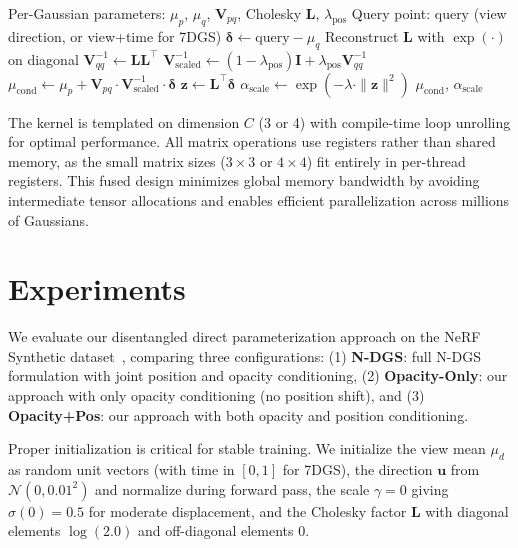 \documentclass{article}
\begin{document}
\begin{algorithm}[h]
\caption{Conditional Gaussian Slicing}
\label{alg:slice}
\begin{algorithmic}[1]
\Require Per-Gaussian parameters: $\mu_p$, $\mu_q$, $\mathbf{V}_{pq}$, Cholesky $\mathbf{L}$, $\lambda_{\text{pos}}$
\Require Query point: $\text{query}$ (view direction, or view+time for 7DGS)
\State $\boldsymbol{\delta} \gets \text{query} - \mu_q$ 
\State Reconstruct $\mathbf{L}$ with $\exp(\cdot)$ on diagonal 
\State $\mathbf{V}_{qq}^{-1} \gets \mathbf{L}\mathbf{L}^\top$ 
\State $\mathbf{V}_{\text{scaled}}^{-1} \gets (1-\lambda_{\text{pos}}) \mathbf{I} + \lambda_{\text{pos}} \mathbf{V}_{qq}^{-1}$ 
\State $\mu_{\text{cond}} \gets \mu_p + \mathbf{V}_{pq} \cdot \mathbf{V}_{\text{scaled}}^{-1} \cdot \boldsymbol{\delta}$ 
\State $\mathbf{z} \gets \mathbf{L}^\top \boldsymbol{\delta}$ 
\State $\alpha_{\text{scale}} \gets \exp(-\lambda \cdot \|\mathbf{z}\|^2)$ 
\State \Return $\mu_{\text{cond}}$, $\alpha_{\text{scale}}$
\end{algorithmic}
\end{algorithm}

The kernel is templated on dimension $C$ (3 or 4) with compile-time loop unrolling for optimal performance. All matrix operations use registers rather than shared memory, as the small matrix sizes ($3\times3$ or $4\times4$) fit entirely in per-thread registers. This fused design minimizes global memory bandwidth by avoiding intermediate tensor allocations and enables efficient parallelization across millions of Gaussians.

\section{Experiments}

We evaluate our disentangled direct parameterization approach on the NeRF Synthetic dataset~\cite{mildenhall2020nerf}, comparing three configurations: (1) \textbf{N-DGS}: full N-DGS formulation with joint position and opacity conditioning, (2) \textbf{Opacity-Only}: our approach with only opacity conditioning (no position shift), and (3) \textbf{Opacity+Pos}: our approach with both opacity and position conditioning.

Proper initialization is critical for stable training. We initialize the view mean $\mu_d$ as random unit vectors (with time in $[0, 1]$ for 7DGS), the direction $\mathbf{u}$ from $\mathcal{N}(0, 0.01^2)$ and normalize during forward pass, the scale $\gamma = 0$ giving $\sigma(0) = 0.5$ for moderate displacement, and the Cholesky factor $\mathbf{L}$ with diagonal elements $\log(2.0)$ and off-diagonal elements 0.
\end{document}
